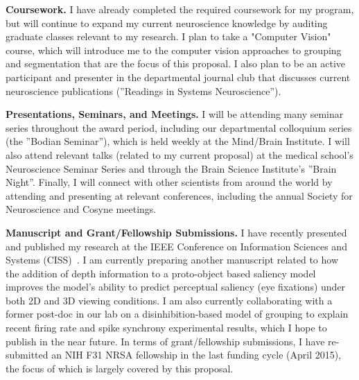 \documentclass[11pt]{article}
\begin{document}
\textbf{Coursework.} I have already completed the required coursework for my program, but will continue to expand my current neuroscience knowledge by auditing graduate classes relevant to my research. I plan to take a "Computer Vision" course, which will introduce me to the computer vision approaches to grouping and segmentation that are the focus of this proposal. I also plan to be an active participant and presenter in the departmental journal club that discusses current neuroscience publications (''Readings in Systems Neuroscience'').

\textbf{Presentations, Seminars, and Meetings.} I will be attending many seminar series throughout the award period, including our departmental colloquium series (the ''Bodian Seminar''), which is held weekly at the Mind/Brain Institute. I will also attend relevant talks (related to my current proposal) at the medical school's Neuroscience Seminar Series and through the Brain Science Institute's ''Brain Night''. Finally, I will connect with other scientists from around the world by attending and presenting at relevant conferences, including the annual Society for Neuroscience and Cosyne meetings.

\textbf{Manuscript and Grant/Fellowship Submissions.} I have recently presented and published my research at the IEEE Conference on Information Sciences and Systems (CISS)~\citep{Hu_etal15a}. I am currently preparing another manuscript related to how the addition of depth information to a proto-object based saliency model improves the model's ability to predict perceptual saliency (eye fixations) under both 2D and 3D viewing conditions. I am also currently collaborating with a former post-doc in our lab on a disinhibition-based model of grouping to explain recent firing rate and spike synchrony experimental results, which I hope to publish in the near future. In terms of grant/fellowship submissions, I have re-submitted an NIH F31 NRSA fellowship in the last funding cycle (April 2015), the focus of which is largely covered by this proposal.

\clearpage
\end{document}
